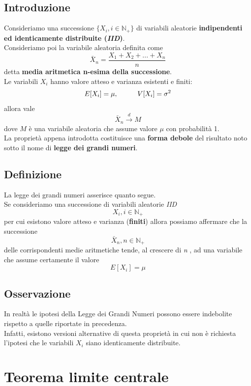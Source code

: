 \subsection{Introduzione}
Consideriamo una successione \(\{X_i, i \in \mathbb{N}_+ \}\) di variabili aleatorie \textbf{indipendenti ed identicamente distribuite (\textit{IID})}. \\
Consideriamo poi la variabile aleatoria definita come
\[
\bar{X}_n = \frac{X_1 + X_2 + ... + X_n}{n} 
\]
detta \textbf{media aritmetica n-esima della successione}.\\
Le variabili $X_i$ hanno valore atteso e varianza esistenti e finiti:
\begin{equation}
	E[X_i] = \mu, \hspace{10mm} V[X_i] = \sigma^2
\end{equation}
allora vale
\[
\bar{X}_n \xrightarrow{d} M
\]
dove $M$ è una variabile aleatoria che assume valore $\mu$ con probabilità 1.\\
La proprietà appena introdotta costituisce una \textbf{forma debole} del risultato noto sotto il nome di \textbf{legge dei grandi numeri}.

\subsection{Definizione}
La legge dei grandi numeri asserisce quanto segue.\\
Se consideriamo una successione di variabili aleatorie \textit{IID} 
\[
X_i, i \in \mathbb{N}_+
\]
per cui esistono valore atteso e varianza (\textbf{finiti}) allora possiamo affermare che la successione
\[
\bar{X}_n, n \in \mathbb{N}_+
\]
delle corrispondenti medie aritmetiche tende, al crescere di \textit{n} , ad una variabile che
assume certamente il valore
\begin{equation}
	E[X_i] = \mu
\end{equation}

\subsection{Osservazione}
In realtà le ipotesi della Legge dei Grandi Numeri possono essere indebolite
rispetto a quelle riportate in precedenza. \\
Infatti, esistono versioni alternative di questa proprietà in cui non è richiesta
l’ipotesi che le variabili $X_i$ siano identicamente distribuite.


\section{Teorema limite centrale}

